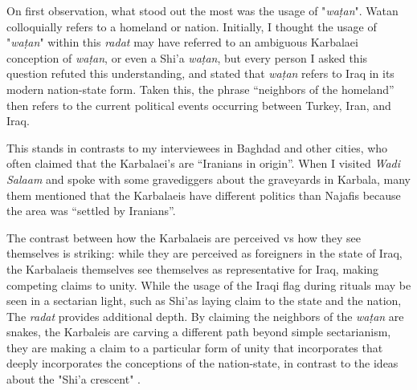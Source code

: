 On first observation, what stood out the most was the usage of "\emph{waṭan}". Watan colloquially refers to a homeland or nation. Initially, I thought the usage of "\emph{waṭan}" within this \emph{radat} may have referred to an ambiguous Karbalaei conception of \emph{waṭan}, or even a Shi'a \emph{waṭan}, but every person I asked this question refuted this understanding, and stated that \emph{waṭan} refers to Iraq in its modern nation-state form. Taken this, the phrase “neighbors of the homeland” then refers to the current political events occurring between Turkey, Iran, and Iraq. 

This stands in contrasts to my interviewees in Baghdad and other cities, who often claimed that the Karbalaei’s are “Iranians in origin”. When I visited \emph{Wadi Salaam} and spoke with some gravediggers about the graveyards in Karbala, many them mentioned that the Karbalaeis have different politics than Najafis because the area was “settled by Iranians”. 

The contrast between how the Karbalaeis are perceived vs how they see themselves is striking: while they are perceived as foreigners in the state of Iraq, the Karbalaeis themselves see themselves as representative for Iraq, making competing claims to unity. While the usage of the Iraqi flag during rituals may be seen in a sectarian light, such as Shi'as laying claim to the state and the nation, The \emph{radat} provides additional depth. By claiming the neighbors of the \emph{waṭan} are snakes, the Karbaleis are carving a different path beyond simple sectarianism, they are making a claim to a particular form of unity that incorporates that deeply incorporates the conceptions of the nation-state, in contrast to the ideas about the "Shi'a crescent" \cite[120]{haddad_understanding_2020}. 

